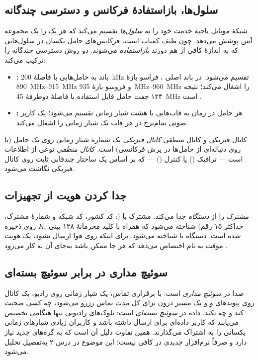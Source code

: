 \documentclass[11pt,a4paper]{article}
\begin{document}
\subsection{سلول‌ها، بازاستفادهٔ فرکانس و دسترسی چندگانه}
شبکهٔ موبایل ناحیهٔ خدمت خود را به \emph{سلول‌ها} تقسیم می‌کند که هر یک را یک مجموعه
آنتن پوشش می‌دهد. چون طیف کمیاب است، فرکانس‌های حامل یکسان در سلول‌هایی که به اندازهٔ
کافی از هم دورند \emph{بازاستفاده} می‌شوند.  دو روش دسترسی چندگانه را ترکیب می‌کند:
\begin{itemize}
  \item \textbf{:} باند به حامل‌هایی با فاصلهٔ \qty{200}{\kilo\hertz} تقسیم می‌شود.
        در باند اصلی ، فراسو بازهٔ \qtyrange{890}{915}{\mega\hertz} و فروسو بازهٔ
        \qtyrange{935}{960}{\mega\hertz} را اشغال می‌کند؛ نتیجه ۱۲۴ جفت حامل قابل استفاده با
        فاصلهٔ دوطرفهٔ \qty{45}{\mega\hertz} است \cite{ts45002}.
  \item \textbf{:} هر حامل در زمان به قاب‌هایی با هشت شیار زمانی تقسیم می‌شود؛
        یک کاربر صوتی تمام‌نرخ در هر قاب یک شیار زمانی را اشغال می‌کند.
\end{itemize}

\begin{definitionbox}{کانال فیزیکی و کانال منطقی}
\emph{کانال فیزیکی} یک شمارهٔ شیار زمانی روی یک حامل (یا روی دنباله‌ای از حامل‌ها در
پرش فرکانسی) است. \emph{کانال منطقی} نوعی از اطلاعات است --- ترافیک () یا
کنترل () --- که بر اساس یک ساختار چندقابی ثابت روی
کانال فیزیکی نگاشت می‌شود.
\end{definitionbox}

\subsection{جدا کردن هویت از تجهیزات}
 \emph{مشترک} را از \emph{دستگاه} جدا می‌کند. مشترک با 
(: کد کشور، کد شبکه و شمارهٔ مشترک، حداکثر
۱۵ رقم) شناخته می‌شود که همراه با کلید محرمانهٔ ۱۲۸ بیتی $K_i$ روی  ذخیره
شده است. دستگاه با  شناخته می‌شود. برای اینکه  روی هوا ارسال نشود،
 یک هویت موقت به نام  اختصاص می‌دهد که هر جا ممکن باشد به‌جای آن
به کار می‌رود \cite{ts23003}.

\subsection{سوئیچ مداری در برابر سوئیچ بسته‌ای}
صدا در  \emph{سوئیچ مداری} است: با برقراری تماس، یک شیار زمانی روی رادیو، یک
کانال روی پیوندهای  و  و یک مسیر درون  برای کل مدت تماس
رزرو می‌شود، چه کسی صحبت کند و چه نکند. داده در  \emph{سوئیچ بسته‌ای} است:
بلوک‌های رادیویی تنها هنگامی تخصیص می‌یابند که کاربر داده‌ای برای ارسال داشته باشد و
کاربران زیادی شیارهای زمانی یکسانی را به اشتراک می‌گذارند. همین تفاوت دلیل آن است که
 به گره‌های جدید نیاز دارد و صرفاً نرم‌افزار جدیدی در  کافی نیست؛
این موضوع در درس ۲ به‌تفصیل تحلیل می‌شود.
\end{document}
